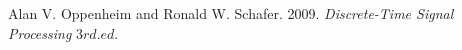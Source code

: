 \documentclass[preview]{standalone}
\begin{document}
\begin{center}
Alan V. Oppenheim and Ronald W. Schafer. 2009. \textit{Discrete-Time Signal Processing} \(3rd. ed.\)
\end{center}
\end{document}
